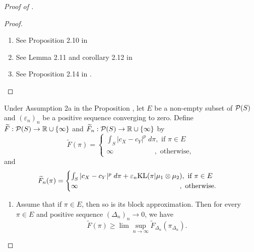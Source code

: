\begin{proof}[Proof of ]
\begin{proof}
\begin{enumerate}
        \item See Proposition 2.10 in \citep{Carlier17}
        \item See Lemma 2.11 and corollary 2.12 in \citep{Carlier17}
        \item See Proposition 2.14 in \citep{Carlier17}.
      \end{enumerate}
    \end{proof}
    \begin{lemma} \label{lemma:limsupinf}
      Under Assumption 2a in the Proposition ,
      let $E$ be a non-empty subset of $\mathcal P(S)$ and $(\varepsilon_n)_n$ be a positive sequence converging to zero.
      Define $\widetilde{F}: \mathcal P(S) \to \mathbb R \cup \{ \infty \}$ and
      $\widetilde{F}_n: \mathcal P(S) \to \mathbb R \cup \{ \infty \}$ by
      \begin{equation}
        \widetilde{F}(\pi) =
        \begin{cases}
          \int_{S} \vert c_X - c_Y \vert^p \; d\pi, \text{ if } \pi \in E \\
          \infty \;\;\;\;\;\;\;\;\;\;\;\;\;\;\;\;\;\;\;\;\; ,\text{ otherwise},
        \end{cases}
      \end{equation}
      and
      \begin{equation}
        \widetilde{F}_n(\pi) =
        \begin{cases}
          \int_{S} \vert c_X - c_Y \vert^p \; d\pi + \varepsilon_n \text{KL}(\pi \vert \mu_1 \otimes \mu_2), \text{ if } \pi \in E \\
          \infty \;\;\;\;\;\;\;\;\;\;\;\;\;\;\;\;\;\;\;\;\;\;\;\;\;\;\;\;\;\;\;\;\;\;\;\;\;\;\;\;\;\;\;\;\;\;\;\;\;\;\;\; ,\text{ otherwise}.
        \end{cases}
      \end{equation}
      \begin{enumerate}
        \item Assume that if $\pi \in E$, then so is its block approximation. Then for every $\pi \in E$ and positive sequence $(\Delta_n)_n \to 0$, we have
        \begin{equation}
          \widetilde{F}(\pi) \geq \lim\sup_{n \to \infty} \widetilde{F}_{\Delta_n}(\pi_{\Delta_n}).
        \end{equation}


\end{enumerate}
\end{lemma}
\end{proof}
